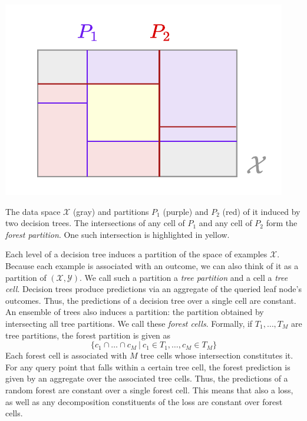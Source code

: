 \documentclass[../main.tex]{subfiles}
\begin{document}
\begin{marginfigure}
    \includegraphics[width=\textwidth]{figma-illustrations/forest-partition.pdf}
    \label{fig:forest-partition}
    \caption{The data space $\mathcal{X}$ (gray) and partitions $P_1$ (purple) and $P_2$ (red) of it induced by two decision trees. The intersections of any cell of $P_1$ and any cell of $P_2$ form the \textit{forest partition}. One such intersection is highlighted in yellow.
    }
\end{marginfigure}
Each level of a decision tree induces a partition of the space of examples $\mathcal{X}$. Because each example is associated with an outcome, we can also think of it as a partition of $(\mathcal{X}, \mathcal{Y})$. We call such a partition a \textit{tree partition} and a cell a \textit{tree cell}.
Decision trees produce predictions via an aggregate of the queried leaf node's outcomes. Thus, the predictions of a decision tree over a single cell are constant.
An ensemble of trees also induces a partition: the partition obtained by intersecting all tree partitions. We call these \textit{forest cells}. Formally, if $T_{1}, \dots, T_{M}$ are tree partitions, the forest partition is given as
$$
\{ c_{1} \cap \dots \cap c_{M} ~|~ c_{1} \in T_{1}, \dots, c_{M} \in T_{M}\}
$$
Each forest cell is associated with $M$ tree cells whose intersection constitutes it.
For any query point that falls within a certain tree cell, the forest prediction is given by an aggregate over the associated tree cells. Thus, the predictions of a random forest are constant over a single forest cell.
This means that also a loss, as well as any decomposition constituents of the loss are constant over forest cells.
\end{document}
